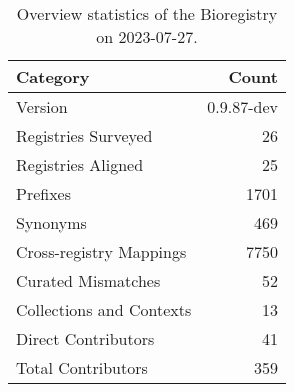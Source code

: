 \begin{table}
\caption{Overview statistics of the Bioregistry on 2023-07-27.}
\label{tab:bioregistry-summary}
\begin{tabular}{lr}
\toprule
Category & Count \\
\midrule
Version & 0.9.87-dev \\
Registries Surveyed & 26 \\
Registries Aligned & 25 \\
Prefixes & 1701 \\
Synonyms & 469 \\
Cross-registry Mappings & 7750 \\
Curated Mismatches & 52 \\
Collections and Contexts & 13 \\
Direct Contributors & 41 \\
Total Contributors & 359 \\
\bottomrule
\end{tabular}
\end{table}
